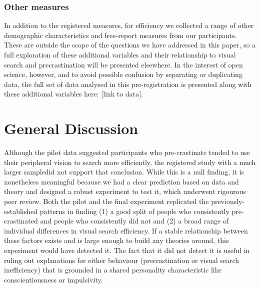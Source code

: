 \documentclass[]{rsos}
\begin{document}
\subsubsection{Other measures}

In addition to the registered measures, for efficiency we collected a range of other demographic characteristics and free-report measures from our participants. These are outside the scope of the questions we have addressed in this paper, so a full exploration of these additional variables and their relationship to visual search and precrastination will be presented elsewhere. In the interest of open science, however, and to avoid possible confusion by separating or duplicating data, the full set of data analysed in this pre-registration is presented along with these additional variables here: [link to data].

\section{General Discussion}
Although the pilot data suggested participants who pre-crastinate tended to use their peripheral vision to search more efficiently, the registered study with a much larger sampledid not support that conclusion. While this is a null finding, it is nonetheless meaningful because we had a clear prediction based on data and theory and designed a robust experiment to test it, which underwent rigourous peer review. Both the pilot and the final experiment replicated the previously-established patterns in finding (1) a good split of people who consistently pre-crastinated and people who consistently did not and (2) a broad range of individual differences in visual search efficiency. If a stable relationship between these factors exists and is large enough to build any theories around, this experiment would have detected it. The fact that it did not detect it is useful in ruling out explanations for either behaviour (precrastination or visual search inefficiency) that is grounded in a shared personality characteristic like conscientiousness or impulsivity. 
\end{document}
